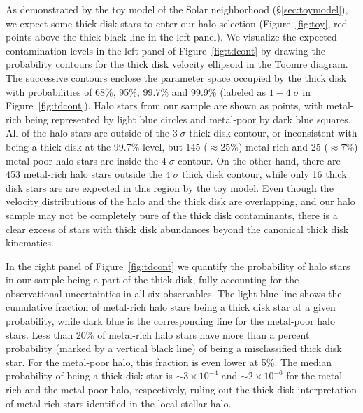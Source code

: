\documentclass[apj, twocolappendix, numberedappendix, appendixfloats]{emulateapj}
\begin{document}
As demonstrated by the toy model of the Solar neighborhood (\S\ref{sec:toymodel}), we expect some thick disk stars to enter our halo selection (Figure~\ref{fig:toy}, red points above the thick black line in the left panel).
We visualize the expected contamination levels in the left panel of Figure~\ref{fig:tdcont} by drawing the probability contours for the thick disk velocity ellipsoid \citep{bensby2003} in the Toomre diagram.
The successive contours enclose the parameter space occupied by the thick disk with probabilities of 68\%, 95\%, 99.7\% and 99.9\% (labeled as $1-4\;\sigma$ in Figure~\ref{fig:tdcont}).
Halo stars from our sample are shown as points, with metal-rich being represented by light blue circles and metal-poor by dark blue squares.
All of the halo stars are outside of the $3\;\sigma$ thick disk contour, or inconsistent with being a thick disk at the 99.7\% level, but 145 ($\approx25\%$) metal-rich and 25 ($\approx7\%$) metal-poor halo stars are inside the $4\;\sigma$ contour.
On the other hand, there are 453 metal-rich halo stars outside the $4\;\sigma$ thick disk contour, while only 16 thick disk stars are are expected in this region by the toy model.
Even though the velocity distributions of the halo and the thick disk are overlapping, and our halo sample may not be completely pure of the thick disk contaminants, there is a clear excess of stars with thick disk abundances beyond the canonical thick disk kinematics.

In the right panel of Figure~\ref{fig:tdcont} we quantify the probability of halo stars in our sample being a part of the thick disk, fully accounting for the observational uncertainties in all six observables.
The light blue line shows the cumulative fraction of metal-rich halo stars being a thick disk star at a given probability, while dark blue is the corresponding line for the metal-poor halo stars.
Less than 20\% of metal-rich halo stars have more than a percent probability (marked by a vertical black line) of being a misclassified thick disk star.
For the metal-poor halo, this fraction is even lower at 5\%.
The median probability of being a thick disk star is $\sim3\times10^{-4}$ and $\sim2\times10^{-6}$ for the metal-rich and the metal-poor halo, respectively, ruling out the thick disk interpretation of metal-rich stars identified in the local stellar halo.
\end{document}
